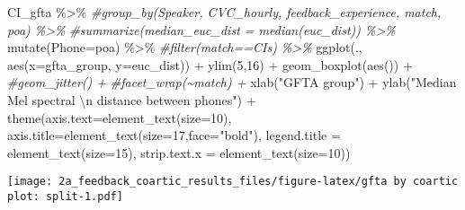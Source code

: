 \documentclass[
]{article}
\newenvironment{Shaded}{\begin{snugshade}}{\end{snugshade}}
\newcommand{\AttributeTok}[1]{\textcolor[rgb]{0.77,0.63,0.00}{#1}}
\newcommand{\CommentTok}[1]{\textcolor[rgb]{0.56,0.35,0.01}{\textit{#1}}}
\newcommand{\DecValTok}[1]{\textcolor[rgb]{0.00,0.00,0.81}{#1}}
\newcommand{\FunctionTok}[1]{\textcolor[rgb]{0.00,0.00,0.00}{#1}}
\newcommand{\NormalTok}[1]{#1}
\newcommand{\SpecialCharTok}[1]{\textcolor[rgb]{0.00,0.00,0.00}{#1}}
\newcommand{\StringTok}[1]{\textcolor[rgb]{0.31,0.60,0.02}{#1}}
\begin{document}
\begin{Shaded}
\begin{Highlighting}[]
\NormalTok{ CI\_gfta }\SpecialCharTok{\%\textgreater{}\%}
  \CommentTok{\#group\_by(Speaker, CVC\_hourly, feedback\_experience, match, poa) \%\textgreater{}\%}
  \CommentTok{\#summarize(median\_euc\_dist = median(euc\_dist)) \%\textgreater{}\%}
  \FunctionTok{mutate}\NormalTok{(}\AttributeTok{Phone=}\NormalTok{poa) }\SpecialCharTok{\%\textgreater{}\%}
  \CommentTok{\#filter(match==\textquotesingle{}CIs\textquotesingle{}) \%\textgreater{}\%}
  \FunctionTok{ggplot}\NormalTok{(., }\FunctionTok{aes}\NormalTok{(}\AttributeTok{x=}\NormalTok{gfta\_group, }\AttributeTok{y=}\NormalTok{euc\_dist)) }\SpecialCharTok{+} 
  \FunctionTok{ylim}\NormalTok{(}\DecValTok{5}\NormalTok{,}\DecValTok{16}\NormalTok{) }\SpecialCharTok{+} 
  \FunctionTok{geom\_boxplot}\NormalTok{(}\FunctionTok{aes}\NormalTok{()) }\SpecialCharTok{+} 
  \CommentTok{\#geom\_jitter() +}
  \CommentTok{\#facet\_wrap(\textasciitilde{}match) +}
  \FunctionTok{xlab}\NormalTok{(}\StringTok{"GFTA group"}\NormalTok{) }\SpecialCharTok{+} 
  \FunctionTok{ylab}\NormalTok{(}\StringTok{"Median Mel spectral }\SpecialCharTok{\textbackslash{}n}\StringTok{ distance between phones"}\NormalTok{) }\SpecialCharTok{+} 
  \FunctionTok{theme}\NormalTok{(}\AttributeTok{axis.text=}\FunctionTok{element\_text}\NormalTok{(}\AttributeTok{size=}\DecValTok{10}\NormalTok{),}
      \AttributeTok{axis.title=}\FunctionTok{element\_text}\NormalTok{(}\AttributeTok{size=}\DecValTok{17}\NormalTok{,}\AttributeTok{face=}\StringTok{"bold"}\NormalTok{),}
      \AttributeTok{legend.title =} \FunctionTok{element\_text}\NormalTok{(}\AttributeTok{size=}\DecValTok{15}\NormalTok{),}
      \AttributeTok{strip.text.x =} \FunctionTok{element\_text}\NormalTok{(}\AttributeTok{size=}\DecValTok{10}\NormalTok{)) }
\end{Highlighting}
\end{Shaded}

\texttt{[image: 2a\_feedback\_coartic\_results\_files/figure-latex/gfta by coartic plot: split-1.pdf]}
\end{document}
